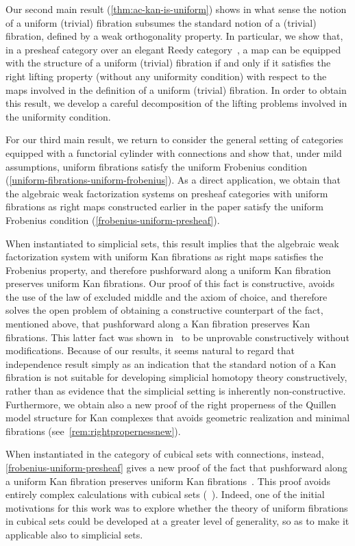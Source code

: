 \documentclass[reqno,10pt,a4paper,oneside,draft]{amsart}
\begin{document}
Our second main result (\cref{thm:ac-kan-is-uniform}) shows in what sense the notion of a uniform (trivial) fibration subsumes the standard notion of a (trivial) fibration, defined by a weak orthogonality property.
In particular, we show that, in a presheaf category over an elegant Reedy category~\cite{bergner-rezk-elegant}, a map can be equipped with the structure of a uniform (trivial) fibration if and only if it satisfies the right lifting property (without any uniformity condition) with respect to the maps involved in the definition of a uniform (trivial) fibration.
In order to obtain this result, we develop a careful decomposition of the lifting problems involved in the uniformity condition.

For our third main result, we return to consider the general setting of categories equipped with a functorial cylinder with connections and show that, under mild assumptions, uniform fibrations satisfy the uniform Frobenius condition (\cref{uniform-fibrations-uniform-frobenius}).
As a direct application, we obtain that the algebraic weak factorization systems on presheaf categories with uniform fibrations as right maps constructed earlier in the paper satisfy the uniform Frobenius condition (\cref{frobenius-uniform-presheaf}).

When instantiated to simplicial sets, this result implies that the algebraic weak factorization system with uniform Kan fibrations as right maps satisfies the Frobenius property, and therefore pushforward along a uniform Kan fibration preserves uniform Kan fibrations.
Our proof of this fact is constructive, \ie avoids the use of the law of excluded middle and the axiom of choice, and therefore solves the open problem of obtaining a constructive counterpart of the fact, mentioned above, that pushforward along a Kan fibration preserves Kan fibrations.
This latter fact was shown in~\cite{coquand-non-constructivity-kan} to be unprovable constructively without modifications.
Because of our results, it seems natural to regard that independence result simply as an indication that the standard notion of a Kan fibration is not suitable for developing simplicial homotopy theory constructively, rather than as evidence that the simplicial setting is inherently non-constructive.
Furthermore, we obtain  also a new proof of the right properness of the Quillen model structure for Kan complexes that avoids 
geometric realization and minimal fibrations (see~\cref{rem:rightpropernessnew}).

When instantiated in the category of cubical sets with connections, instead, \cref{frobenius-uniform-presheaf} gives a new proof of the fact that pushforward along a uniform Kan fibration preserves uniform Kan fibrations~\cite{cohen-et-al:cubicaltt}.
This proof avoids entirely complex calculations with cubical sets (\cf~\cite{huber-thesis}).
Indeed, one of the initial motivations for this work was to explore whether the theory of uniform fibrations in cubical sets could be developed at a greater level of generality, so as to make it applicable also to simplicial sets.
\end{document}
